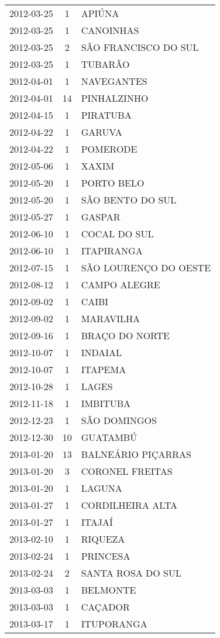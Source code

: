 \documentclass[
	12pt,				%
	openright,			%
	oneside,			%
	a4paper,			%
	english,			%
	french,				%
	spanish,			%
	brazil				%
	dvipsnames, table]{abntex2}
\begin{document}
\begin{longtable}[htbp]{ccl}
2012-03-25 & 1 & APIÚNA \\
2012-03-25 & 1 & CANOINHAS \\
2012-03-25 & 2 & SÃO FRANCISCO DO SUL \\
2012-03-25 & 1 & TUBARÃO \\
2012-04-01 & 1 & NAVEGANTES \\
2012-04-01 & 14 & PINHALZINHO \\
2012-04-15 & 1 & PIRATUBA \\
2012-04-22 & 1 & GARUVA \\
2012-04-22 & 1 & POMERODE \\
2012-05-06 & 1 & XAXIM \\
2012-05-20 & 1 & PORTO BELO \\
2012-05-20 & 1 & SÃO BENTO DO SUL \\
2012-05-27 & 1 & GASPAR \\
2012-06-10 & 1 & COCAL DO SUL \\
2012-06-10 & 1 & ITAPIRANGA \\
2012-07-15 & 1 & SÃO LOURENÇO DO OESTE \\
2012-08-12 & 1 & CAMPO ALEGRE \\
2012-09-02 & 1 & CAIBI \\
2012-09-02 & 1 & MARAVILHA \\
2012-09-16 & 1 & BRAÇO DO NORTE \\
2012-10-07 & 1 & INDAIAL \\
2012-10-07 & 1 & ITAPEMA \\
2012-10-28 & 1 & LAGES \\
2012-11-18 & 1 & IMBITUBA \\
2012-12-23 & 1 & SÃO DOMINGOS \\
2012-12-30 & 10 & GUATAMBÚ \\
2013-01-20 & 13 & BALNEÁRIO PIÇARRAS \\
2013-01-20 & 3 & CORONEL FREITAS \\
2013-01-20 & 1 & LAGUNA \\
2013-01-27 & 1 & CORDILHEIRA ALTA \\
2013-01-27 & 1 & ITAJAÍ \\
2013-02-10 & 1 & RIQUEZA \\
2013-02-24 & 1 & PRINCESA \\
2013-02-24 & 2 & SANTA ROSA DO SUL \\
2013-03-03 & 1 & BELMONTE \\
2013-03-03 & 1 & CAÇADOR \\
2013-03-17 & 1 & ITUPORANGA \\

\end{longtable}
\end{document}
